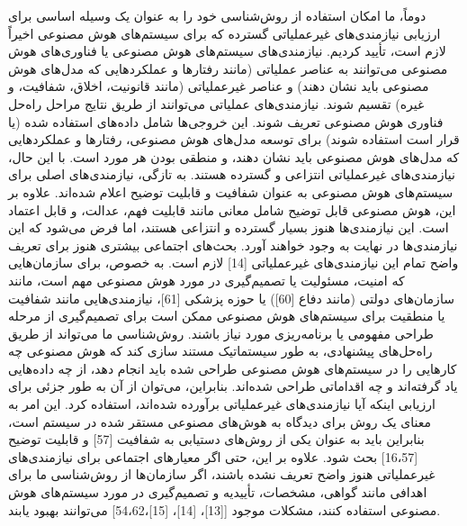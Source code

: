 \documentclass[a4paper,10pt]{article}
\begin{document}
        دوماً، ما امکان استفاده از روش‌شناسی خود را به عنوان یک وسیله اساسی برای ارزیابی نیازمندی‌های غیرعملیاتی گسترده که برای سیستم‌های هوش مصنوعی اخیراً لازم است، تأیید کردیم. نیازمندی‌های سیستم‌های هوش مصنوعی یا فناوری‌های هوش مصنوعی می‌توانند به عناصر عملیاتی (مانند رفتارها و عملکردهایی که مدل‌های هوش مصنوعی باید نشان دهند) و عناصر غیرعملیاتی (مانند قانونیت، اخلاق، شفافیت، و غیره) تقسیم شوند. نیازمندی‌های عملیاتی می‌توانند از طریق نتایج مراحل راه‌حل فناوری هوش مصنوعی تعریف شوند. این خروجی‌ها شامل داده‌های استفاده شده (یا قرار است استفاده شوند) برای توسعه مدل‌های هوش مصنوعی، رفتارها و عملکردهایی که مدل‌های هوش مصنوعی باید نشان دهند، و منطقی بودن هر مورد است. با این حال، نیازمندی‌های غیرعملیاتی انتزاعی و گسترده هستند. به تازگی، نیازمندی‌های اصلی برای سیستم‌های هوش مصنوعی به عنوان شفافیت و قابلیت توضیح اعلام شده‌اند. علاوه بر این، هوش مصنوعی قابل توضیح شامل معانی مانند قابلیت فهم، عدالت، و قابل اعتماد است. این نیازمندی‌ها هنوز بسیار گسترده و انتزاعی هستند، اما فرض می‌شود که این نیازمندی‌ها در نهایت به وجود خواهند آورد. بحث‌های اجتماعی بیشتری هنوز برای تعریف واضح تمام این نیازمندی‌های غیرعملیاتی [14] لازم است. به خصوص، برای سازمان‌هایی که امنیت، مسئولیت یا تصمیم‌گیری در مورد هوش مصنوعی مهم است، مانند سازمان‌های دولتی (مانند دفاع [60]) یا حوزه پزشکی [61]، نیازمندی‌هایی مانند شفافیت یا منطقیت برای سیستم‌های هوش مصنوعی ممکن است برای تصمیم‌گیری از مرحله طراحی مفهومی یا برنامه‌ریزی مورد نیاز باشند. روش‌شناسی ما می‌تواند از طریق راه‌حل‌های پیشنهادی، به طور سیستماتیک مستند سازی کند که هوش مصنوعی چه کارهایی را در سیستم‌های هوش مصنوعی طراحی شده باید انجام دهد، از چه داده‌هایی یاد گرفته‌اند و چه اقداماتی طراحی شده‌اند. بنابراین، می‌توان از آن به طور جزئی برای ارزیابی اینکه آیا نیازمندی‌های غیرعملیاتی برآورده شده‌اند، استفاده کرد. این امر به معنای یک روش برای دیدگاه به هوش‌های مصنوعی مستقر شده در سیستم است، بنابراین باید به عنوان یکی از روش‌های دستیابی به شفافیت [57] و قابلیت توضیح [16،57] بحث شود. علاوه بر این، حتی اگر معیارهای اجتماعی برای نیازمندی‌های غیرعملیاتی هنوز واضح تعریف نشده باشند، اگر سازمان‌ها از روش‌شناسی ما برای اهدافی مانند گواهی، مشخصات، تأییدیه و تصمیم‌گیری در مورد سیستم‌های هوش مصنوعی استفاده کنند، مشکلات موجود [[13]، [14]، [15]،54،62] می‌توانند بهبود یابند.
\end{document}
